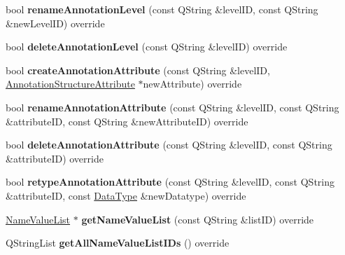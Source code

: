\begin{DoxyCompactItemize}
bool {\bfseries rename\+Annotation\+Level} (const Q\+String \&level\+ID, const Q\+String \&new\+Level\+ID) override
\item 
\mbox{\label{class_x_m_l_annotation_datastore_a60355c10568bedd1e5e4bf84bb261b17}} 
bool {\bfseries delete\+Annotation\+Level} (const Q\+String \&level\+ID) override
\item 
\mbox{\label{class_x_m_l_annotation_datastore_af5071be39e7843e792120bc35dc382de}} 
bool {\bfseries create\+Annotation\+Attribute} (const Q\+String \&level\+ID, \hyperlink{class_annotation_structure_attribute}{Annotation\+Structure\+Attribute} $\ast$new\+Attribute) override
\item 
\mbox{\label{class_x_m_l_annotation_datastore_a3def381ab4aeabaab20b3d5f2d1bef49}} 
bool {\bfseries rename\+Annotation\+Attribute} (const Q\+String \&level\+ID, const Q\+String \&attribute\+ID, const Q\+String \&new\+Attribute\+ID) override
\item 
\mbox{\label{class_x_m_l_annotation_datastore_accb40cff86565935d79f78ca3796fb3d}} 
bool {\bfseries delete\+Annotation\+Attribute} (const Q\+String \&level\+ID, const Q\+String \&attribute\+ID) override
\item 
\mbox{\label{class_x_m_l_annotation_datastore_aaabfb69a5dcfe9c8908505b7c1107622}} 
bool {\bfseries retype\+Annotation\+Attribute} (const Q\+String \&level\+ID, const Q\+String \&attribute\+ID, const \hyperlink{class_data_type}{Data\+Type} \&new\+Datatype) override
\item 
\mbox{\label{class_x_m_l_annotation_datastore_a02fb5e5faceb95f36af8c7868cb58692}} 
\hyperlink{class_name_value_list}{Name\+Value\+List} $\ast$ {\bfseries get\+Name\+Value\+List} (const Q\+String \&list\+ID) override
\item 
\mbox{\label{class_x_m_l_annotation_datastore_a41a82e92412edf6b9d3cb827e6ce430c}} 
Q\+String\+List {\bfseries get\+All\+Name\+Value\+List\+I\+Ds} () override
\item 
\mbox{\label{class_x_m_l_annotation_datastore_ab7b2331626ac68b10af99d244bb5aa7f}} 

\end{DoxyCompactItemize}
